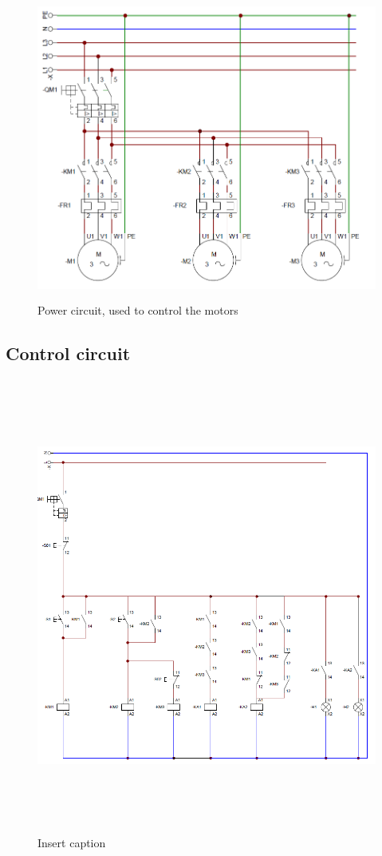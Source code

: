 \documentclass[runningheads]{llncs}
\begin{document}
\begin{figure}[!ht]
    \centering
    \caption{Power circuit, used to control the motors}\label{fig:powerCircuit}
    \includegraphics[width=\linewidth, height=10cm]{images/powerCircuit.png}
\end{figure}

\newpage
\subsection{Control circuit}
\begin{figure}[!ht]
    \centering
    \caption{Insert caption}\label{fig:controlCircuit}
    \includegraphics[width=\linewidth, height=15cm]{images/controlCircuit.png}
\end{figure}

% 
% 
\end{document}
